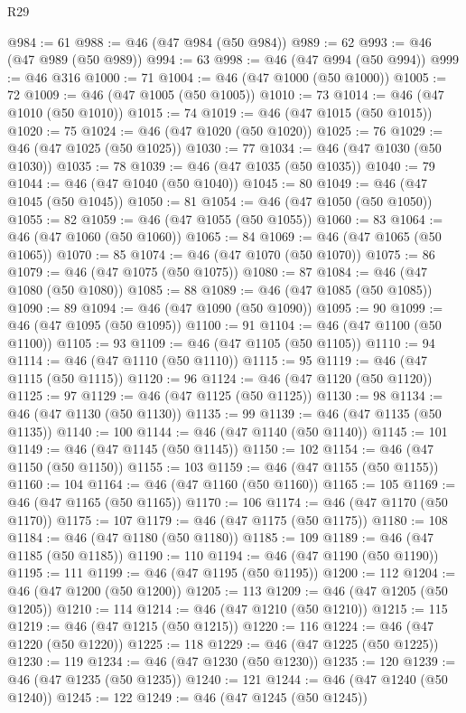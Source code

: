 \begin{lexlean}{R29}
\begin{coremodule}
@984 := 61
@988 := @46 (@47 @984 (@50 @984))
@989 := 62
@993 := @46 (@47 @989 (@50 @989))
@994 := 63
@998 := @46 (@47 @994 (@50 @994))
@999 := @46 @316
@1000 := 71
@1004 := @46 (@47 @1000 (@50 @1000))
@1005 := 72
@1009 := @46 (@47 @1005 (@50 @1005))
@1010 := 73
@1014 := @46 (@47 @1010 (@50 @1010))
@1015 := 74
@1019 := @46 (@47 @1015 (@50 @1015))
@1020 := 75
@1024 := @46 (@47 @1020 (@50 @1020))
@1025 := 76
@1029 := @46 (@47 @1025 (@50 @1025))
@1030 := 77
@1034 := @46 (@47 @1030 (@50 @1030))
@1035 := 78
@1039 := @46 (@47 @1035 (@50 @1035))
@1040 := 79
@1044 := @46 (@47 @1040 (@50 @1040))
@1045 := 80
@1049 := @46 (@47 @1045 (@50 @1045))
@1050 := 81
@1054 := @46 (@47 @1050 (@50 @1050))
@1055 := 82
@1059 := @46 (@47 @1055 (@50 @1055))
@1060 := 83
@1064 := @46 (@47 @1060 (@50 @1060))
@1065 := 84
@1069 := @46 (@47 @1065 (@50 @1065))
@1070 := 85
@1074 := @46 (@47 @1070 (@50 @1070))
@1075 := 86
@1079 := @46 (@47 @1075 (@50 @1075))
@1080 := 87
@1084 := @46 (@47 @1080 (@50 @1080))
@1085 := 88
@1089 := @46 (@47 @1085 (@50 @1085))
@1090 := 89
@1094 := @46 (@47 @1090 (@50 @1090))
@1095 := 90
@1099 := @46 (@47 @1095 (@50 @1095))
@1100 := 91
@1104 := @46 (@47 @1100 (@50 @1100))
@1105 := 93
@1109 := @46 (@47 @1105 (@50 @1105))
@1110 := 94
@1114 := @46 (@47 @1110 (@50 @1110))
@1115 := 95
@1119 := @46 (@47 @1115 (@50 @1115))
@1120 := 96
@1124 := @46 (@47 @1120 (@50 @1120))
@1125 := 97
@1129 := @46 (@47 @1125 (@50 @1125))
@1130 := 98
@1134 := @46 (@47 @1130 (@50 @1130))
@1135 := 99
@1139 := @46 (@47 @1135 (@50 @1135))
@1140 := 100
@1144 := @46 (@47 @1140 (@50 @1140))
@1145 := 101
@1149 := @46 (@47 @1145 (@50 @1145))
@1150 := 102
@1154 := @46 (@47 @1150 (@50 @1150))
@1155 := 103
@1159 := @46 (@47 @1155 (@50 @1155))
@1160 := 104
@1164 := @46 (@47 @1160 (@50 @1160))
@1165 := 105
@1169 := @46 (@47 @1165 (@50 @1165))
@1170 := 106
@1174 := @46 (@47 @1170 (@50 @1170))
@1175 := 107
@1179 := @46 (@47 @1175 (@50 @1175))
@1180 := 108
@1184 := @46 (@47 @1180 (@50 @1180))
@1185 := 109
@1189 := @46 (@47 @1185 (@50 @1185))
@1190 := 110
@1194 := @46 (@47 @1190 (@50 @1190))
@1195 := 111
@1199 := @46 (@47 @1195 (@50 @1195))
@1200 := 112
@1204 := @46 (@47 @1200 (@50 @1200))
@1205 := 113
@1209 := @46 (@47 @1205 (@50 @1205))
@1210 := 114
@1214 := @46 (@47 @1210 (@50 @1210))
@1215 := 115
@1219 := @46 (@47 @1215 (@50 @1215))
@1220 := 116
@1224 := @46 (@47 @1220 (@50 @1220))
@1225 := 118
@1229 := @46 (@47 @1225 (@50 @1225))
@1230 := 119
@1234 := @46 (@47 @1230 (@50 @1230))
@1235 := 120
@1239 := @46 (@47 @1235 (@50 @1235))
@1240 := 121
@1244 := @46 (@47 @1240 (@50 @1240))
@1245 := 122
@1249 := @46 (@47 @1245 (@50 @1245))

\end{coremodule}
\end{lexlean}

